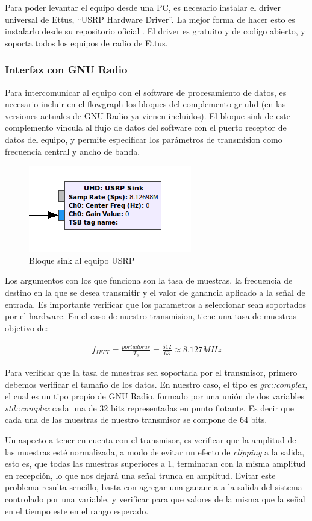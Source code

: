 Para poder levantar el equipo desde una PC, es necesario instalar el driver universal de Ettus, “USRP Hardware Driver”. La mejor forma de hacer esto es instalarlo desde su repositorio oficial \cite{UHD}. El driver es gratuito y de codigo abierto, y soporta todos los equipos de radio de Ettus.


\subsubsection{Interfaz con GNU Radio}

Para intercomunicar al equipo con el software de procesamiento de datos, es necesario incluir en el flowgraph los bloques del complemento gr-uhd (en las versiones actuales de GNU Radio ya vienen incluidos). El bloque sink de este complemento vincula al flujo de datos del software con el puerto receptor de datos del equipo, y permite especificar los parámetros de transmision como frecuencia central y ancho de banda.

\begin{figure}[h!]
	\centering
	\includegraphics[scale=0.55]{figuras/cap04/sink_block}
	\caption{\label{f:sink_block} Bloque sink al equipo USRP}
\end{figure}

Los argumentos con los que funciona son la tasa de muestras, la frecuencia de destino en la que se desea transmitir y el valor de ganancia aplicado a la señal de entrada. Es importante verificar que los parametros a seleccionar sean soportados por el hardware. En el caso de nuestro transmision, tiene una tasa de muestras objetivo de:

\begin{gather*}
	f_{IFFT} = \frac{portadoras}{T_{s}} = \frac{512}{63} \approx 8.127 MHz
\end{gather*}

Para verificar que la tasa de muestras sea soportada por el transmisor, primero debemos verificar el tamaño de los datos. En nuestro caso, el tipo es \textit{grc::complex}, el cual es un tipo propio de GNU Radio, formado por una unión de dos variables \textit{std::complex} cada una de 32 bits representadas en punto flotante. Es decir que cada una de las muestras de nuestro transmisor se compone de 64 bits.

Un aspecto a tener en cuenta con el transmisor, es verificar que la amplitud de las muestras esté normalizada, a modo de evitar un efecto de \textit{clipping} a la salida, esto es, que todas las muestras superiores a 1, terminaran con la misma amplitud en recepción, lo que nos dejará una señal trunca en amplitud. Evitar este problema resulta sencillo, basta con agregar una ganancia a la salida del sistema controlado por una variable, y verificar para que valores de la misma que la señal en el tiempo este en el rango esperado.